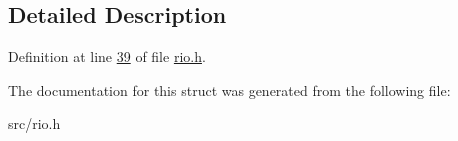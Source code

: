 \subsection{Detailed Description}


Definition at line \hyperlink{rio_8h_source_l00039}{39} of file \hyperlink{rio_8h_source}{rio.\+h}.



The documentation for this struct was generated from the following file\+:\begin{DoxyCompactItemize}
\item 
src/rio.\+h\end{DoxyCompactItemize}
